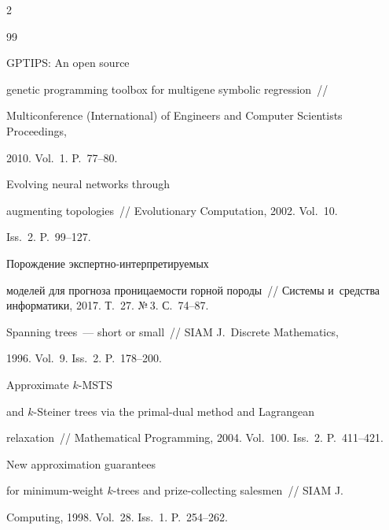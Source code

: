 \begin{multicols}{2}
{{\begin{thebibliography}{99}

 GPTIPS: An open source 

genetic programming toolbox for multigene  symbolic regression~// 

Multiconference (International) of Engineers and Computer Scientists Proceedings, 

2010. Vol.~1. P.~77--80.




 Evolving neural networks through 

augmenting topologies~// Evolutionary Computation, 2002. Vol.~10. 

Iss.~2. P.~99--127.




 Порождение экс\-перт\-но-ин\-тер\-пре\-ти\-ру\-емых 

моделей для прогноза проницаемости горной породы~// Системы и~средства информатики, 2017. Т.~27. №\,3. С.~74--87.

%





Spanning trees~--- short or small~// SIAM J.~Discrete Mathematics, 

1996. Vol.~9. Iss.~2. P.~178--200.




 Approximate $k$-MSTS 

and $k$-Steiner trees via the primal-dual method and Lagrangean 

relaxation~// Mathematical Programming, 2004. Vol.~100. Iss.~2. P.~411--421.




 New approximation guarantees 

for minimum-weight $k$-trees and prize-collecting salesmen~// SIAM J. 

Computing, 1998. Vol.~28. Iss.~1. P.~254--262.




\end{thebibliography}}}
\end{multicols}
